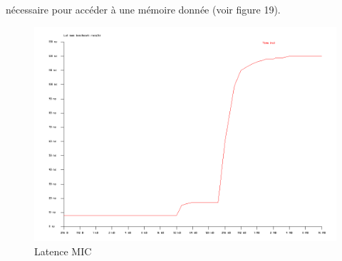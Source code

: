 \documentclass[11pt]{article}
\begin{document}
					nécessaire pour accéder à une mémoire donnée (voir figure 19).
					\begin{figure}[!b]
					\begin{center}
					\includegraphics[scale=0.33]{latmem.png}
					\caption{Latence MIC}
					\end{center}
					\end{figure}
\end{document}
